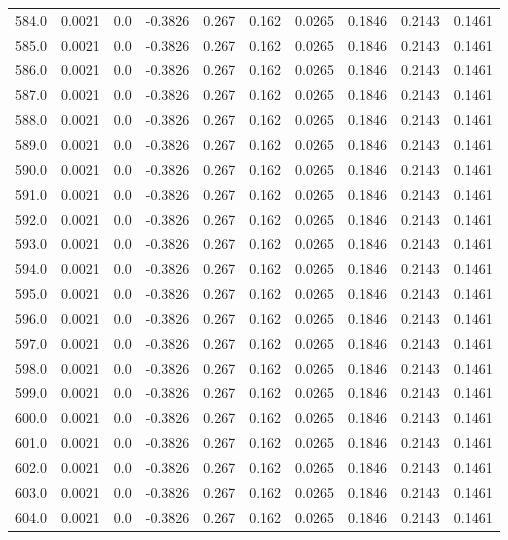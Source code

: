 \begin{longtable}{lrrrrrrrrr}
584.0 & 0.0021 & 0.0 & -0.3826 & 0.267 & 0.162 & 0.0265 & 0.1846 & 0.2143 & 0.1461 \\
585.0 & 0.0021 & 0.0 & -0.3826 & 0.267 & 0.162 & 0.0265 & 0.1846 & 0.2143 & 0.1461 \\
586.0 & 0.0021 & 0.0 & -0.3826 & 0.267 & 0.162 & 0.0265 & 0.1846 & 0.2143 & 0.1461 \\
587.0 & 0.0021 & 0.0 & -0.3826 & 0.267 & 0.162 & 0.0265 & 0.1846 & 0.2143 & 0.1461 \\
588.0 & 0.0021 & 0.0 & -0.3826 & 0.267 & 0.162 & 0.0265 & 0.1846 & 0.2143 & 0.1461 \\
589.0 & 0.0021 & 0.0 & -0.3826 & 0.267 & 0.162 & 0.0265 & 0.1846 & 0.2143 & 0.1461 \\
590.0 & 0.0021 & 0.0 & -0.3826 & 0.267 & 0.162 & 0.0265 & 0.1846 & 0.2143 & 0.1461 \\
591.0 & 0.0021 & 0.0 & -0.3826 & 0.267 & 0.162 & 0.0265 & 0.1846 & 0.2143 & 0.1461 \\
592.0 & 0.0021 & 0.0 & -0.3826 & 0.267 & 0.162 & 0.0265 & 0.1846 & 0.2143 & 0.1461 \\
593.0 & 0.0021 & 0.0 & -0.3826 & 0.267 & 0.162 & 0.0265 & 0.1846 & 0.2143 & 0.1461 \\
594.0 & 0.0021 & 0.0 & -0.3826 & 0.267 & 0.162 & 0.0265 & 0.1846 & 0.2143 & 0.1461 \\
595.0 & 0.0021 & 0.0 & -0.3826 & 0.267 & 0.162 & 0.0265 & 0.1846 & 0.2143 & 0.1461 \\
596.0 & 0.0021 & 0.0 & -0.3826 & 0.267 & 0.162 & 0.0265 & 0.1846 & 0.2143 & 0.1461 \\
597.0 & 0.0021 & 0.0 & -0.3826 & 0.267 & 0.162 & 0.0265 & 0.1846 & 0.2143 & 0.1461 \\
598.0 & 0.0021 & 0.0 & -0.3826 & 0.267 & 0.162 & 0.0265 & 0.1846 & 0.2143 & 0.1461 \\
599.0 & 0.0021 & 0.0 & -0.3826 & 0.267 & 0.162 & 0.0265 & 0.1846 & 0.2143 & 0.1461 \\
600.0 & 0.0021 & 0.0 & -0.3826 & 0.267 & 0.162 & 0.0265 & 0.1846 & 0.2143 & 0.1461 \\
601.0 & 0.0021 & 0.0 & -0.3826 & 0.267 & 0.162 & 0.0265 & 0.1846 & 0.2143 & 0.1461 \\
602.0 & 0.0021 & 0.0 & -0.3826 & 0.267 & 0.162 & 0.0265 & 0.1846 & 0.2143 & 0.1461 \\
603.0 & 0.0021 & 0.0 & -0.3826 & 0.267 & 0.162 & 0.0265 & 0.1846 & 0.2143 & 0.1461 \\
604.0 & 0.0021 & 0.0 & -0.3826 & 0.267 & 0.162 & 0.0265 & 0.1846 & 0.2143 & 0.1461 \\

\end{longtable}
